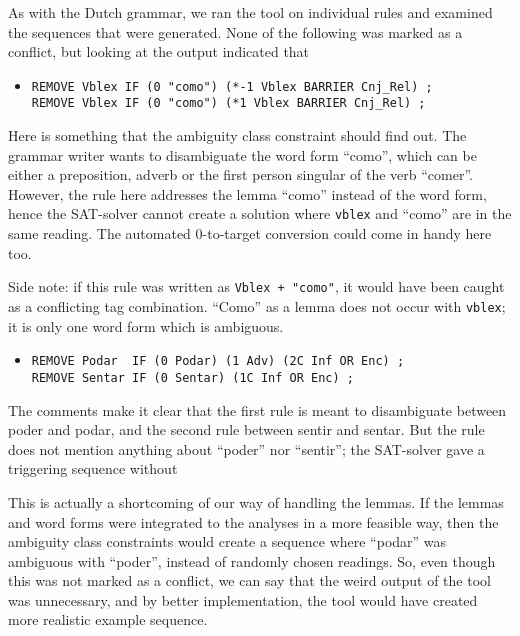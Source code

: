 As with the Dutch grammar, we ran the tool on individual rules and examined the sequences that were generated. None of the following was marked as a conflict, but looking at the output indicated that 

\begin{itemize}
\item[] 
\begin{verbatim}
REMOVE Vblex IF (0 "como") (*-1 Vblex BARRIER Cnj_Rel) ;
REMOVE Vblex IF (0 "como") (*1 Vblex BARRIER Cnj_Rel) ;
\end{verbatim}
\end{itemize}

Here is something that the ambiguity class constraint should find out.
The grammar writer wants to disambiguate the word form ``como'', which can be either a preposition, adverb or the first person singular of the verb ``comer''. 
However, the rule here addresses the lemma ``como'' instead of the word form, hence the SAT-solver cannot create a solution where \texttt{vblex} and ``como'' are in the same reading. The automated 0-to-target conversion could come in handy here too.

Side note: if this rule was written as \texttt{Vblex + "como"}, it would have been caught as a conflicting tag combination. ``Como'' as a lemma does not occur with \texttt{vblex}; it is only one word form which is ambiguous.

\begin{itemize}
\item[] 
\begin{verbatim}
REMOVE Podar  IF (0 Podar) (1 Adv) (2C Inf OR Enc) ;
REMOVE Sentar IF (0 Sentar) (1C Inf OR Enc) ;
\end{verbatim}
\end{itemize}

The comments make it clear that the first rule is meant to disambiguate between poder and podar, and the second rule between sentir and sentar. But the rule does not mention anything about ``poder'' nor ``sentir''; the SAT-solver gave a triggering sequence without 

This is actually a shortcoming of our way of handling the lemmas. If the lemmas and word forms were integrated to the analyses in a more feasible way, then the ambiguity class constraints would create a sequence where ``podar'' was ambiguous with ``poder'', instead of randomly chosen readings. So, even though this was not marked as a conflict, we can say that the weird output of the tool was unnecessary, and by better implementation, the tool would have created more realistic example sequence.




